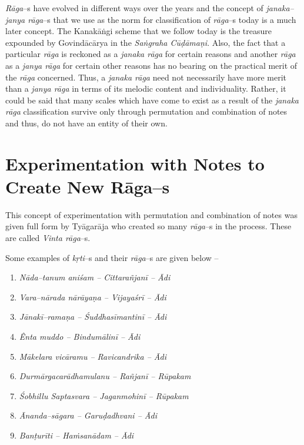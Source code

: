 \textit{Rāga}–s have evolved in different ways over the years and the concept of \textit{janaka–janya rāga}–s that we use as the norm for classification of \textit{rāga}–s today is a much later concept. The Kanakāṅgi scheme that we follow today is the treasure expounded by Govindācārya in the \textit{Saṅgraha Cūḍāmaṇi}. Also, the fact that a particular \textit{rāga} is reckoned as a \textit{janaka rāga} for certain reasons and another \textit{rāga} as a \textit{janya rāga} for certain other reasons has no bearing on the practical merit of the \textit{rāga} concerned. Thus, a \textit{janaka rāga} need not necessarily have more merit than a \textit{janya rāga} in terms of its melodic content and individuality. Rather, it could be said that many scales which have come to exist as a result of the \textit{janaka rāga} classification survive only through permutation and combination of notes and thus, do not have an entity of their own.


\section*{Experimentation with Notes to Create New Rāga–s}

This concept of experimentation with permutation and combination of notes was given full form by Tyāgarāja who created so many \textit{rāga}–s in the process. These are called \textit{Vinta rāga}–s.

Some examples of \textit{kṛti}–s and their \textit{rāga}–s are given below –

\vspace{-.3cm}

\begin{enumerate}
\itemsep=0pt
\item \textit{Nāda–tanum aniśam – Cittarañjanī – Ādi}

 \item \textit{Vara–nārada nārāyaṇa – Vijayaśrī – Ādi}

 \item \textit{Jānakī–ramaṇa – Śuddhasīmantinī – Ādi} 

 \item \textit{Ênta muddo – Bindumālinī – Ādi}

 \item \textit{Mākelara vicāramu – Ravicandrika – Ādi}

 \item \textit{Durmārgacarādhamulanu – Rañjanī – Rūpakam}

 \item \textit{Śobhillu Saptasvara – Jaganmohinī – Rūpakam}

 \item \textit{Ānanda–sāgara – Garuḍadhvani – Ādi}

 \item \textit{Banṭurīti – Haṁsanādam – Ādi}

\end{enumerate}

